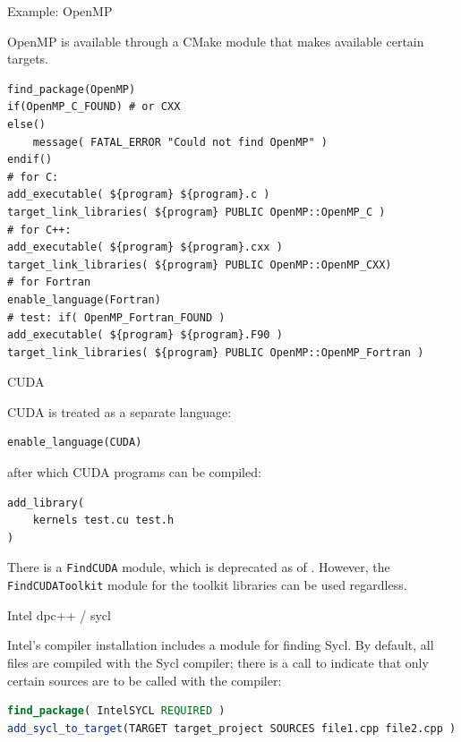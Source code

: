 
 {Example: OpenMP}
\label{sec:cmake-omp}

OpenMP is available through a CMake module
that makes available certain targets.
\begin{lstlisting}
find_package(OpenMP)
if(OpenMP_C_FOUND) # or CXX
else()
	message( FATAL_ERROR "Could not find OpenMP" )
endif()
# for C:
add_executable( ${program} ${program}.c )
target_link_libraries( ${program} PUBLIC OpenMP::OpenMP_C )
# for C++:
add_executable( ${program} ${program}.cxx )
target_link_libraries( ${program} PUBLIC OpenMP::OpenMP_CXX)
# for Fortran
enable_language(Fortran)
# test: if( OpenMP_Fortran_FOUND )
add_executable( ${program} ${program}.F90 )
target_link_libraries( ${program} PUBLIC OpenMP::OpenMP_Fortran )
\end{lstlisting}



 {CUDA}

\ac{CUDA} is treated as a separate language:
\begin{lstlisting}
enable_language(CUDA)
\end{lstlisting}
after which \ac{CUDA} programs can be compiled:
\begin{lstlisting}
add_library( 
    kernels test.cu test.h
)  
\end{lstlisting}

\begin{remark}
  There is a \lstinline{FindCUDA} module,
  which is deprecated as of .
  However, the \lstinline{FindCUDAToolkit} module
  for the toolkit libraries can be used regardless.
\end{remark}

 {Intel dpc++ / sycl}



Intel's compiler installation includes 
a module for finding Sycl.
By default, all files are compiled with the Sycl compiler;
there is a call to indicate that only certain sources
are to be called with the  compiler:
\begin{lstlisting}[language=cmake]
find_package( IntelSYCL REQUIRED )
add_sycl_to_target(TARGET target_project SOURCES file1.cpp file2.cpp )
\end{lstlisting}

